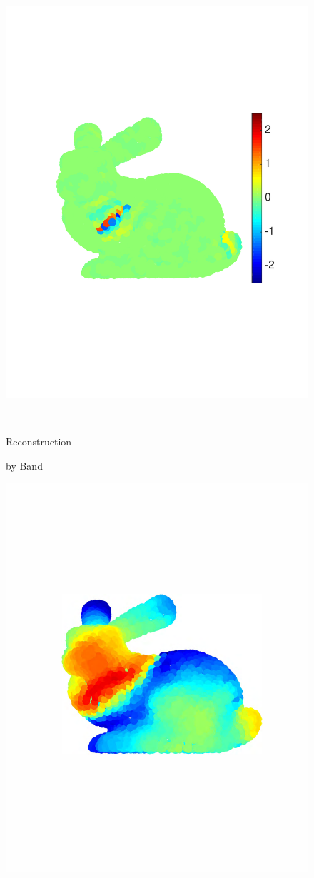 \documentclass{article}
\begin{document}
\begin{figure}[bth]
\begin{minipage}[m]{0.16\linewidth}
\end{minipage}
\begin{minipage}[m]{0.16\linewidth}
\centerline{\includegraphics[width=.85\linewidth]{fig_bunny_coef_wav4}}
\end{minipage}\\
\begin{minipage}[m]{0.16\linewidth}
\centerline{\small{Reconstruction}}
\centerline{\small{by Band}}
\end{minipage}
\begin{minipage}[m]{0.16\linewidth}
\centerline{\includegraphics[width=.8\linewidth]{fig_bunny_rec_scaling}}

\end{minipage}
\end{figure}
\end{document}
